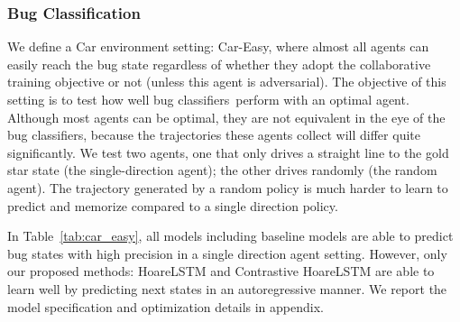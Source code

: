 \documentclass{article}
\newcommand{\bugcls}{bug classifiers~}
\newcommand{\EDIT}[1]{#1}%
\begin{document}
\subsubsection{Bug Classification}
\label{sec:bug-identification}
\vspace{-2mm} 

\EDIT{We define a Car environment setting: Car-Easy,} where almost all agents can easily reach the bug state regardless of whether they adopt the collaborative training objective or not (unless this agent is adversarial). \EDIT{The objective of this setting} is to test how well \bugcls perform  with an optimal agent.
\EDIT{Although most agents can be optimal, they are not equivalent in the eye of the bug classifiers, because the trajectories these agents collect will differ quite significantly. We test two agents, one that only drives a straight line to the gold star state (the single-direction agent); the other drives randomly (the random agent). The trajectory generated by a random policy is much harder to learn to predict and memorize compared to a single direction policy.}

In Table~\ref{tab:car_easy}, all models including baseline models are able to predict bug states with high precision in a single direction agent setting. However, only our proposed methods: HoareLSTM and Contrastive HoareLSTM are able to learn well by predicting next states in an autoregressive manner. 
We report the model specification and optimization details in appendix.
\end{document}
